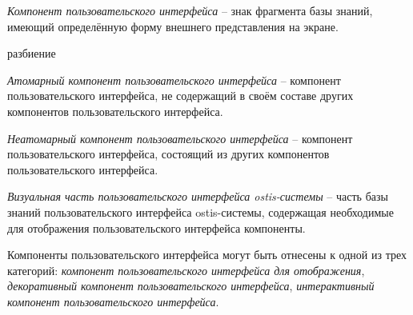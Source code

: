 \textit{Компонент пользовательского интерфейса} -- знак фрагмента базы знаний, имеющий определённую форму внешнего представления на экране.

\begin{scnrelfromset}{разбиение}
\end{scnrelfromset}

\bigskip
\textit{Атомарный компонент пользовательского интерфейса} -- компонент пользовательского интерфейса, не содержащий в своём составе других компонентов пользовательского интерфейса.

\textit{Неатомарный компонент пользовательского интерфейса} -- компонент пользовательского интерфейса, состоящий из других компонентов пользовательского интерфейса.

\textit{Визуальная часть пользовательского интерфейса ostis-системы} -- часть базы знаний пользовательского интерфейса ostis-системы, содержащая необходимые для отображения пользовательского интерфейса компоненты.

\bigskip
Компоненты пользовательского интерфейса могут быть отнесены к одной из трех категорий: \textit{компонент пользовательского интерфейса для отображения}, \textit{декоративный компонент пользовательского интерфейса}, \textit{интерактивный компонент пользовательского интерфейса}.


